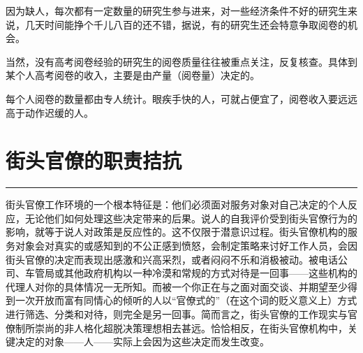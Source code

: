 \documentclass[12pt,a4paper]{article}
\begin{document}
因为缺人，每次都有一定数量的研究生参与进来，对一些经济条件不好的研究生来说，几天时间能挣个千儿八百的还不错，据说，有的研究生还会特意争取阅卷的机会。





当然，没有高考阅卷经验的研究生的阅卷质量往往被重点关注，反复核查。具体到某个人高考阅卷的收入，主要是由产量（阅卷量）决定的。





每个人阅卷的数量都由专人统计。眼疾手快的人，可就占便宜了，阅卷收入要远远高于动作迟缓的人。

\newpage\section{街头官僚的职责拮抗}
\vspace{0.5em}
\vspace{0.3em}

\noindent\rule{\textwidth}{0.4pt}

\vspace{0.3em}





街头官僚工作环境的一个根本特征是：他们必须面对服务对象对自己决定的个人反应，无论他们如何处理这些决定带来的后果。说人的自我评价受到街头官僚行为的影响，就等于说人对政策是反应性的。这不仅限于潜意识过程。街头官僚机构的服务对象会对真实的或感知到的不公正感到愤怒，会制定策略来讨好工作人员，会因街头官僚的决定而表现出感激和兴高采烈，或者闷闷不乐和消极被动。被电话公司、车管局或其他政府机构以一种冷漠和常规的方式对待是一回事——这些机构的代理人对你的具体情况一无所知。而被一个你正在与之面对面交谈、并期望至少得到一次开放而富有同情心的倾听的人以“官僚式的”（在这个词的贬义意义上）方式进行筛选、分类和对待，则完全是另一回事。简而言之，街头官僚的工作现实与官僚制所崇尚的非人格化超脱决策理想相去甚远。恰恰相反，在街头官僚机构中，关键决定的对象——人——实际上会因为这些决定而发生改变。
\end{document}
